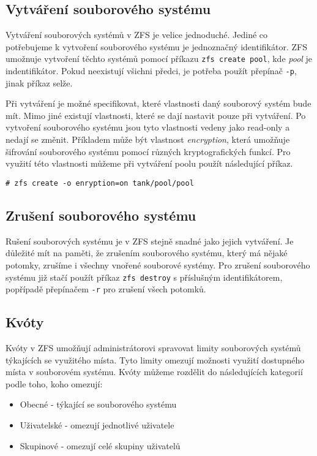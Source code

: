 \subsection{Vytváření souborového systému}
\label{createfs}
Vytváření souborových systémů v ZFS je velice jednoduché. Jediné co potřebujeme k vytvoření souborového systému je jednoznačný identifikátor. ZFS umožnuje vytvoření těchto systémů pomocí příkazu \verb|zfs create pool|, kde \emph{pool} je indentifikátor. Pokud neexistují všichni předci, je potřeba použít přepínač \verb|-p|, jinak příkaz selže.

Při vytváření je možné specifikovat, které vlastnosti daný souborový systém bude mít. Mimo jiné existují vlastnosti, které se dají nastavit pouze při vytváření. Po vytvoření souborového systému jsou tyto vlastnosti vedeny jako read-only a nedají se změnit. Příkladem může být vlastnost \emph{encryption}, která umožňuje šifrování souborového systému pomocí různých kryptografických funkcí. Pro využití této vlastnosti můžeme při vytváření poolu použít následující příkaz.
\begin{verbatim}
# zfs create -o enryption=on tank/pool/pool
\end{verbatim}
\subsection{Zrušení souborového systému}
Rušení souborových systému je v ZFS stejně snadné jako jejich vytváření. Je důležité mít na paměti, že zrušením souborového systému, který má nějaké potomky, zrušíme i všechny vnořené souborové systémy. Pro zrušení souborového systému již stačí použít příkaz \verb|zfs destroy| s příslušným identifikátorem, popřípadě přepínačem \verb|-r| pro zrušení všech potomků.
\subsection{Kvóty}
\label{quota}

Kvóty v ZFS umožňují administrátorovi spravovat limity souborových systémů týkajících se využitého místa. Tyto limity omezují možnosti využití dostupného místa v souborovém systému. Kvóty můžeme rozdělit do následujících kategorií podle toho, koho omezují:
\begin{itemize}
  \item Obecné - týkající se souborového systému
  \item Uživatelské - omezují jednotlivé uživatele
  \item Skupinové - omezují celé skupiny uživatelů
\end{itemize}

